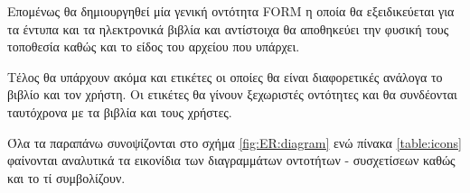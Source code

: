 \documentclass{assignment}
\begin{document}
Επομένως θα δημιουργηθεί μία γενική οντότητα FORM η οποία θα εξειδικεύεται για τα έντυπα και τα ηλεκτρονικά βιβλία και αντίστοιχα θα αποθηκεύει την φυσική τους τοποθεσία καθώς και το είδος του αρχείου που υπάρχει.

Τέλος θα υπάρχουν ακόμα και ετικέτες οι οποίες θα είναι διαφορετικές ανάλογα το βιβλίο και τον χρήστη. Οι ετικέτες θα γίνουν ξεχωριστές οντότητες και θα συνδέονται ταυτόχρονα με τα βιβλία και τους χρήστες.

Όλα τα παραπάνω συνοψίζονται στο σχήμα \ref{fig:ER:diagram} ενώ  πίνακα \ref{table:icons} φαίνονται αναλυτικά τα εικονίδια των διαγραμμάτων οντοτήτων - συσχετίσεων καθώς και το τί συμβολίζουν.


\end{document}
